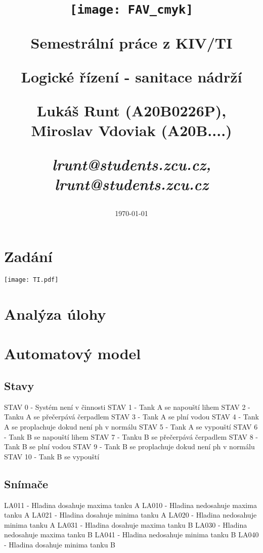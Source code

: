 \documentclass[12pt, a4paper]{article}
\title{\texttt{[image: FAV\_cmyk]}

{\huge Semestrální práce z KIV/TI}

\vspace{0.5cm}
{\LARGE Logické řízení - sanitace nádrží}
\vspace{1cm} 

\Large Lukáš Runt (A20B0226P), Miroslav Vdoviak (A20B....)
\vspace{0.5cm} 

\large \itshape lrunt@students.zcu.cz, lrunt@students.zcu.cz
}
\date{\vspace{6cm} \today}
\begin{document}
\begin{titlepage}
\clearpage\maketitle
\thispagestyle{empty}
\end{titlepage}
\tableofcontents \newpage

\section{Zadání}
\texttt{[image: TI.pdf]}

\section{Analýza úlohy}

\section{Automatový model}

\subsection{Stavy}
STAV 0 - Systém není v činnosti \newline 
STAV 1 - Tank A se napouští lihem \newline 
STAV 2 - Tanku A se přečerpává čerpadlem \newline 
STAV 3 - Tank A se plní vodou \newline 
STAV 4 - Tank A se proplachuje dokud není ph v normálu \newline 
STAV 5 - Tank A se vypouští \newline 
STAV 6 - Tank B se napouští lihem \newline 
STAV 7 - Tanku B se přečerpává čerpadlem \newline 
STAV 8 - Tank B se plní vodou \newline 
STAV 9 - Tank B se proplachuje dokud není ph v normálu \newline 
STAV 10 - Tank B se vypouští 

\subsection{Snímače}
LA011 - Hladina dosahuje maxima tanku A \newline 
LA010 - Hladina nedosahuje maxima tanku A \newline 
LA021 - Hladina dosahuje minima tanku A \newline 
LA020 - Hladina nedosahuje minima tanku A \newline 
LA031 - Hladina dosahuje maxima tanku B \newline
LA030 - Hladina nedosahuje maxima tanku B \newline 
LA041 - Hladina nedosahuje minima tanku B \newline 
LA040 - Hladina dosahuje minima tanku B
\end{document}
